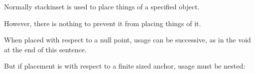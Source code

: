 \documentclass{article}
\begin{document}
Normally stackinset is used to place things
 of a specified object.

However, there is nothing to prevent it from placing things
 of it.

When placed with respect to a null point, usage can be successive, 
as in the void at the end of this sentence.

But if placement is with respect to a finite sized anchor, usage must be nested:

\end{document}
